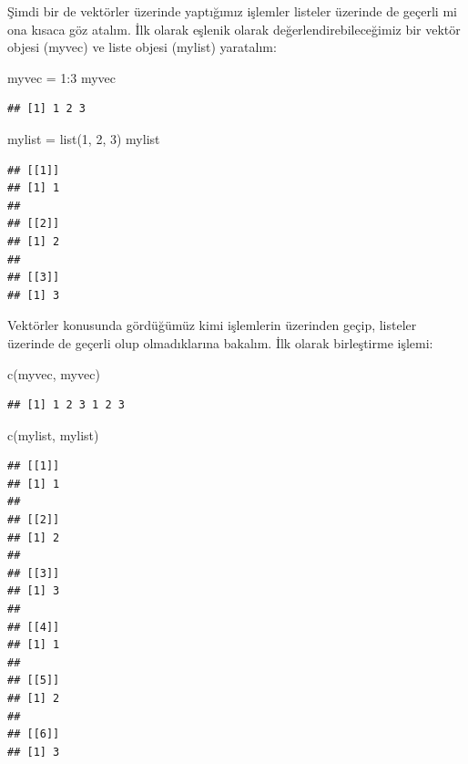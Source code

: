 \documentclass[
]{book}
\newenvironment{Shaded}{\begin{snugshade}}{\end{snugshade}}
\newcommand{\DecValTok}[1]{\textcolor[rgb]{0.00,0.00,0.81}{#1}}
\newcommand{\FunctionTok}[1]{\textcolor[rgb]{0.00,0.00,0.00}{#1}}
\newcommand{\NormalTok}[1]{#1}
\newcommand{\OtherTok}[1]{\textcolor[rgb]{0.56,0.35,0.01}{#1}}
\newcommand{\SpecialCharTok}[1]{\textcolor[rgb]{0.00,0.00,0.00}{#1}}
\begin{document}
Şimdi bir de vektörler üzerinde yaptığımız işlemler listeler üzerinde de geçerli mi ona kısaca göz atalım. İlk olarak eşlenik olarak değerlendirebileceğimiz bir vektör objesi (myvec) ve liste objesi (mylist) yaratalım:

\begin{Shaded}
\begin{Highlighting}[]
\NormalTok{myvec }\OtherTok{=} \DecValTok{1}\SpecialCharTok{:}\DecValTok{3}
\NormalTok{myvec}
\end{Highlighting}
\end{Shaded}

\begin{verbatim}
## [1] 1 2 3
\end{verbatim}

\begin{Shaded}
\begin{Highlighting}[]
\NormalTok{mylist }\OtherTok{=} \FunctionTok{list}\NormalTok{(}\DecValTok{1}\NormalTok{, }\DecValTok{2}\NormalTok{, }\DecValTok{3}\NormalTok{)}
\NormalTok{mylist}
\end{Highlighting}
\end{Shaded}

\begin{verbatim}
## [[1]]
## [1] 1
## 
## [[2]]
## [1] 2
## 
## [[3]]
## [1] 3
\end{verbatim}

Vektörler konusunda gördüğümüz kimi işlemlerin üzerinden geçip, listeler üzerinde de geçerli olup olmadıklarına bakalım. İlk olarak birleştirme işlemi:

\begin{Shaded}
\begin{Highlighting}[]
\FunctionTok{c}\NormalTok{(myvec, myvec)}
\end{Highlighting}
\end{Shaded}

\begin{verbatim}
## [1] 1 2 3 1 2 3
\end{verbatim}

\begin{Shaded}
\begin{Highlighting}[]
\FunctionTok{c}\NormalTok{(mylist, mylist)}
\end{Highlighting}
\end{Shaded}

\begin{verbatim}
## [[1]]
## [1] 1
## 
## [[2]]
## [1] 2
## 
## [[3]]
## [1] 3
## 
## [[4]]
## [1] 1
## 
## [[5]]
## [1] 2
## 
## [[6]]
## [1] 3
\end{verbatim}
\end{document}
